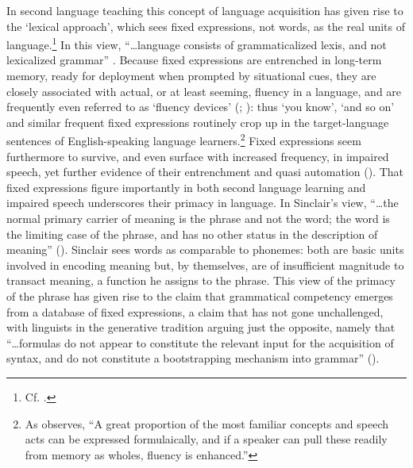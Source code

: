 \documentclass[output=paper]{langsci/langscibook}
\begin{document}
In second language teaching this concept of language acquisition has given rise to the ‘lexical approach’, which sees fixed expressions, not words, as the real units of language.\footnote{ \textrm{Cf. \citealt{lewis_lexical_1993}.}} In this view, “…language consists of grammaticalized lexis, and not lexicalized grammar” \citep[63]{MacKenzie2000b}. Because fixed expressions are entrenched in long-term memory, ready for deployment when prompted by situational cues, they are closely associated with actual, or at least seeming, fluency in a language, and are frequently even referred to as ‘fluency devices’ (\citealt[174]{mackenzie_improvisation_2000}; \citealt[3]{wood_formulaic_2002}): thus ‘you know’, ‘and so on’ and similar frequent fixed expressions routinely crop up in the target-language sentences of English-speaking language learners.\footnote{ \textrm{As \citet[7]{wood_formulaic_2002} observes, “A great proportion of the most familiar concepts and speech acts can be expressed formulaically, and if a speaker can pull these readily from memory as wholes, fluency is enhanced.”}} Fixed expressions seem furthermore to survive, and even surface with increased frequency, in impaired speech, yet further evidence of their entrenchment and quasi automation (\citealt[xxiv]{granger_phraseology:_2008}). That fixed expressions figure importantly in both second language learning and impaired speech underscores their primacy in language. In Sinclair’s view, “…the normal primary carrier of meaning is the phrase and not the word; the word is the limiting case of the phrase, and has no other status in the description of meaning” (\citeyear[409]{granger_phrase_2008}). Sinclair sees words as comparable to phonemes: both are basic units involved in encoding meaning but, by themselves, are of insufficient magnitude to transact meaning, a function he assigns to the phrase. This view of the primacy of the phrase has given rise to the claim that grammatical competency emerges from a database of fixed expressions, a claim that has not gone unchallenged, with linguists in the generative tradition arguing just the opposite, namely that “…formulas do not appear to constitute the relevant input for the acquisition of syntax, and do not constitute a bootstrapping mechanism into grammar” (\citealt[85]{bardovi-harlig_unconventional_2017}).
\end{document}
